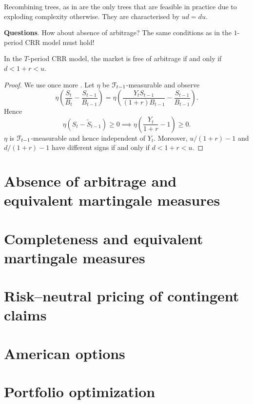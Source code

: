 \documentclass[12pt]{amsart}
\begin{document}
\begin{remark}
    Recombining trees, as in  are the only trees that are feasible in practice due to exploding complexity otherwise. They are characterised by \(ud=du\).
\end{remark}

\textbf{Questions}. How about absence of arbitrage? The same conditions as in the \(1\)-period CRR model must hold!

\begin{theorem}
    In the \(T\)-period CRR model, the market is free of arbitrage if and only if \(d < 1+r < u\).
\end{theorem}
\begin{proof}
    We use once more .
    Let \(\eta\) be \(\mathcal{F}_{t-1}\)-measurable and observe \[
        \eta\left(\frac{S_t}{B_t}-\frac{S_{t-1}}{B_{t-1}}\right) = \eta\left( \frac{Y_tS_{t-1}}{(1+r)B_{t-1}}-\frac{S_{t-1}}{B_{t-1}} \right).
    \]
    Hence \[
        \eta(S_t-\tilde{S}_{t-1}) \geq 0 \implies \eta\left(\frac{Y_t}{1+r}-1\right) \geq 0.
    \]
    \(\eta\) is \(\mathcal{F}_{t-1}\)-measurable and hence independent of \(Y_t\). Moreover, \(u/(1+r)-1\) and \(d/(1+r)-1\) have different signs if and only if \(d < 1+r < u\).
\end{proof}

\section{Absence of arbitrage and equivalent martingale measures}
\section{Completeness and equivalent martingale measures}
\section{Risk--neutral pricing of contingent claims}
\section{American options}
\section{Portfolio optimization}
\end{document}
